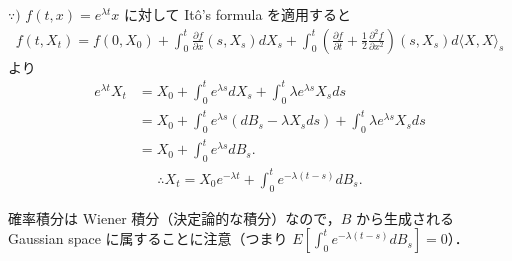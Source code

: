 \documentclass{jsarticle}
\begin{document}
\begin{screen}
    $\because)$
    $f(t, x)=e^{\lambda t}x$ に対して It\^{o}'s formula を適用すると
    \begin{align}
        f(t, X_{t})
        = f(0, X_{0})
        + \int_{0}^{t}\frac{\partial f}{\partial x}(s, X_{s})dX_{s}
        + \int_{0}^{t}(\frac{\partial f}{\partial t} + \frac{1}{2}\frac{\partial^2 f}{\partial x^2})(s, X_{s})d\langle X, X\rangle_{s}
    \end{align}
    より
    \begin{align}
        e^{\lambda t}X_{t}
        &= X_{0}
        + \int_{0}^{t}e^{\lambda s}dX_{s}
        + \int_{0}^{t}\lambda e^{\lambda s}X_{s}ds \\
        &= X_{0}
        + \int_{0}^{t}e^{\lambda s}(dB_{s} - \lambda X_{s}ds)
        + \int_{0}^{t}\lambda e^{\lambda s}X_{s}ds \\
        &= X_{0}
        + \int_{0}^{t}e^{\lambda s}dB_{s}.
    \end{align}
    \begin{align}
        \therefore X_{t}
        = X_{0}e^{-\lambda t}
        + \int_{0}^{t}e^{-\lambda(t-s)}dB_{s}.
    \end{align}
\end{screen}

確率積分は Wiener 積分（決定論的な積分）なので，$B$ から生成される Gaussian space に属することに注意（つまり $E[\int_{0}^{t}e^{-\lambda(t-s)}dB_{s}]=0$）．
\end{document}
